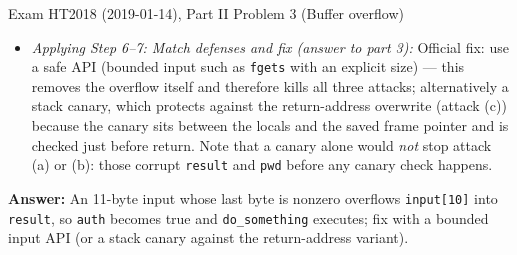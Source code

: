 \documentclass[12pt, a4paper]{article}
\begin{document}
\begin{practicebox}{Exam HT2018 (2019-01-14), Part II Problem 3 (Buffer overflow)}
\begin{itemize}
    \item \textit{Applying Step 6--7: Match defenses and fix (answer to part 3):} Official fix: use a safe API (bounded input such as \texttt{fgets} with an explicit size) --- this removes the overflow itself and therefore kills all three attacks; alternatively a stack canary, which protects against the return-address overwrite (attack (c)) because the canary sits between the locals and the saved frame pointer and is checked just before return. Note that a canary alone would \emph{not} stop attack (a) or (b): those corrupt \texttt{result} and \texttt{pwd} before any canary check happens.
\end{itemize}
\textbf{Answer:} An 11-byte input whose last byte is nonzero overflows \texttt{input[10]} into \texttt{result}, so \texttt{auth} becomes true and \texttt{do\_something} executes; fix with a bounded input API (or a stack canary against the return-address variant).
\end{practicebox}
\end{document}
